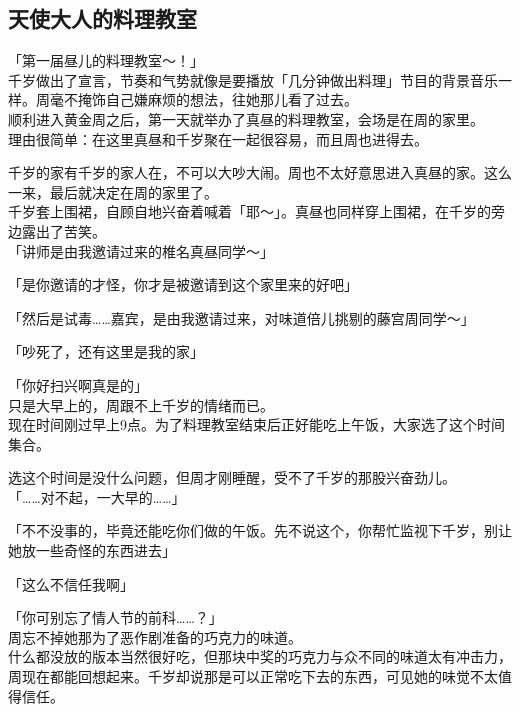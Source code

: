 \subsection{天使大人的料理教室}

「第一届昼儿的料理教室～！」\\

千岁做出了宣言，节奏和气势就像是要播放「几分钟做出料理」节目的背景音乐一样。周毫不掩饰自己嫌麻烦的想法，往她那儿看了过去。\\

顺利进入黄金周之后，第一天就举办了真昼的料理教室，会场是在周的家里。\\

理由很简单：在这里真昼和千岁聚在一起很容易，而且周也进得去。

千岁的家有千岁的家人在，不可以大吵大闹。周也不太好意思进入真昼的家。这么一来，最后就决定在周的家里了。\\

千岁套上围裙，自顾自地兴奋着喊着「耶～」。真昼也同样穿上围裙，在千岁的旁边露出了苦笑。\\

「讲师是由我邀请过来的椎名真昼同学～」

「是你邀请的才怪，你才是被邀请到这个家里来的好吧」

「然后是试毒……嘉宾，是由我邀请过来，对味道倍儿挑剔的藤宫周同学～」

「吵死了，还有这里是我的家」

「你好扫兴啊真是的」\\

只是大早上的，周跟不上千岁的情绪而已。\\

现在时间刚过早上9点。为了料理教室结束后正好能吃上午饭，大家选了这个时间集合。

选这个时间是没什么问题，但周才刚睡醒，受不了千岁的那股兴奋劲儿。\\

「……对不起，一大早的……」

「不不没事的，毕竟还能吃你们做的午饭。先不说这个，你帮忙监视下千岁，别让她放一些奇怪的东西进去」

「这么不信任我啊」

「你可别忘了情人节的前科……？」\\

周忘不掉她那为了恶作剧准备的巧克力的味道。\\

什么都没放的版本当然很好吃，但那块中奖的巧克力与众不同的味道太有冲击力，周现在都能回想起来。千岁却说那是可以正常吃下去的东西，可见她的味觉不太值得信任。\\

